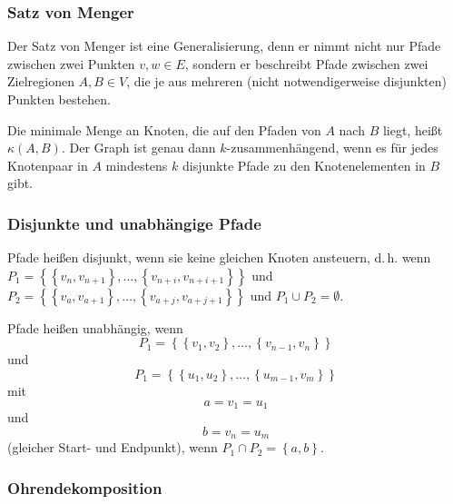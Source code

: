 \documentclass{scrartcl}
\begin{document}
\subsubsection{Satz von Menger}

Der Satz von Menger ist eine Generalisierung, denn er nimmt nicht nur Pfade zwischen zwei Punkten $v, w \in E$,
sondern er beschreibt Pfade zwischen zwei Zielregionen $A, B \in V$, die je aus mehreren (nicht notwendigerweise
disjunkten) Punkten bestehen. 


Die minimale Menge an Knoten, die auf den Pfaden von $A$ nach $B$ liegt, heißt $\kappa(A, B)$. Der Graph ist genau dann $k$-zusammenhängend,
wenn es für jedes Knotenpaar in $A$ mindestens $k$ disjunkte Pfade zu den Knotenelementen in $B$ gibt.

\subsubsection{Disjunkte und unabhängige Pfade}

Pfade heißen disjunkt, wenn sie keine gleichen Knoten ansteuern, d.\,h. wenn $P_1 = \left\{\left\{v_n, v_{n + 1}\right\}, \dots, \left\{v_{n + i}, v_{n + i + 1}\right\}\right\}$
und $P_2 = \left\{\left\{v_a, v_{a + 1}\right\}, \dots, \left\{v_{a + j}, v_{a + j + 1}\right\}\right\}$ und
$P_1 \cup P_2 = \emptyset$.

Pfade heißen unabhängig, wenn 
\begin{equation}
	P_1 = \left\{\left\{v_1, v_2\right\}, \dots, \left\{v_{n - 1}, v_n\right\}\right\}
\end{equation}
und
\begin{equation}
	P_1 = \left\{\left\{u_1, u_2\right\}, \dots, \left\{u_{m - 1}, v_m\right\}\right\}
\end{equation}
mit 
\begin{equation}
	a = v_1 = u_1
\end{equation}
und 
\begin{equation}
	b = v_n = u_m
\end{equation}
(gleicher
Start- und Endpunkt), wenn $P_1 \cap P_2 = \left\{a, b\right\}$.

\subsubsection{Ohrendekomposition}
\end{document}
